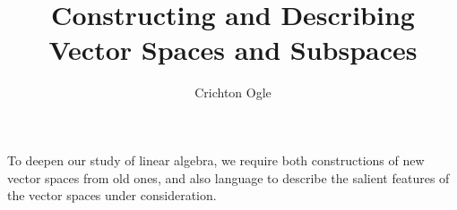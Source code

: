 \documentclass{ximera}
\title{Constructing and Describing Vector Spaces and Subspaces}
\author{Crichton Ogle}
\begin{document}
\begin{abstract}
\end{abstract}
\maketitle

To deepen our study of linear algebra, we require both constructions
of new vector spaces from old ones, and also language to describe the
salient features of the vector spaces under consideration.
\end{document}
